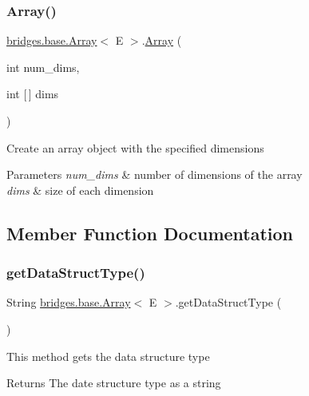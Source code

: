 \subsubsection{\texorpdfstring{Array()}{Array()}\hspace{0.1cm}{\footnotesize\ttfamily [2/2]}}
{\footnotesize\ttfamily \hyperlink{classbridges_1_1base_1_1_array}{bridges.\+base.\+Array}$<$ E $>$.\hyperlink{classbridges_1_1base_1_1_array}{Array} (\begin{DoxyParamCaption}\item[{int}]{num\+\_\+dims,  }\item[{int \mbox{[}$\,$\mbox{]}}]{dims }\end{DoxyParamCaption})}

Create an array object with the specified dimensions


\begin{DoxyParams}{Parameters}
{\em num\+\_\+dims} & number of dimensions of the array \\
\hline
{\em dims} & size of each dimension \\
\hline
\end{DoxyParams}


\subsection{Member Function Documentation}
\hypertarget{classbridges_1_1base_1_1_array_ad138b9787d46d053d6bd324b344be9a6}{}\label{classbridges_1_1base_1_1_array_ad138b9787d46d053d6bd324b344be9a6} 
\subsubsection{\texorpdfstring{get\+Data\+Struct\+Type()}{getDataStructType()}}
{\footnotesize\ttfamily String \hyperlink{classbridges_1_1base_1_1_array}{bridges.\+base.\+Array}$<$ E $>$.get\+Data\+Struct\+Type (\begin{DoxyParamCaption}{ }\end{DoxyParamCaption})}

This method gets the data structure type

\begin{DoxyReturn}{Returns}
The date structure type as a string 
\end{DoxyReturn}
\hypertarget{classbridges_1_1base_1_1_array_af7aa7f3f18989af5f48a2b69cb7fb07d}{}\label{classbridges_1_1base_1_1_array_af7aa7f3f18989af5f48a2b69cb7fb07d} 
